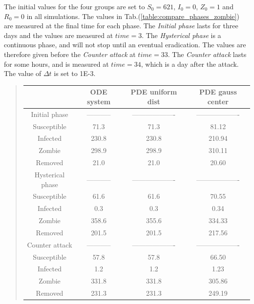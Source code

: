 \documentclass[%
twoside,                 %
final,                   %
10pt]{article}
\begin{document}
\vspace{3mm}




\vspace{3mm}


The initial values for the four groups are set to $S_0=621$, $I_0=0$, $Z_0=1$ and $R_0= 0$ in all simulations. The values in Tab.(\ref{table:compare_phases_zombie}) are measured at the final time for each phase. The \emph{Initial phase} lasts for three days and the values are measured at $time=3$. The \emph{Hysterical phase} is a continuous phase, and will not stop until an eventual eradication. The values are therefore given before the \emph{Counter attack} at $time=33$. The \emph{Counter attack} lasts for some hours, and is measured at $time=34$, which is a day after the attack. The value of $\Delta t$ is set to 1E-3. 

\label{table:compare_phases_zombie}

\begin{quote}
\begin{tabular}{cccc}
\hline
\multicolumn{1}{c}{  } & \multicolumn{1}{c}{ ODE system } & \multicolumn{1}{c}{ PDE uniform dist } & \multicolumn{1}{c}{ PDE gauss center } \\
\hline
Initial phase    & ----------- & ------------------- & ------------------- \\
\hline
Susceptible      & 71.3        & 71.3                & 81.12               \\
Infected         & 230.8       & 230.8               & 210.94              \\
Zombie           & 298.9       & 298.9               & 310.11              \\
Removed          & 21.0        & 21.0                & 20.60               \\
\hline
Hysterical phase & ----------- & ------------------- & ------------------- \\
\hline
Susceptible      & 61.6        & 61.6                & 70.55               \\
Infected         & 0.3         & 0.3                 & 0.34                \\
Zombie           & 358.6       & 355.6               & 334.33              \\
Removed          & 201.5       & 201.5               & 217.56              \\
\hline
Counter attack   & ----------- & ------------------- & ------------------- \\
\hline
Susceptible      & 57.8        & 57.8                & 66.50               \\
Infected         & 1.2         & 1.2                 & 1.23                \\
Zombie           & 331.8       & 331.8               & 305.86              \\
Removed          & 231.3       & 231.3               & 249.19              \\
\hline
\end{tabular}
\end{quote}
\end{document}
